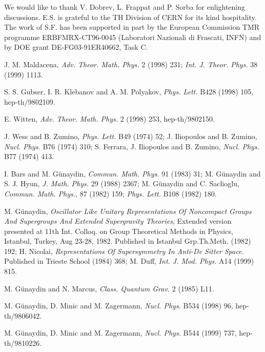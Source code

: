 \documentclass[a4paper,12pt]{article}
\begin{document}
We would like to thank V. Dobrev, L. Frappat and P. Sorba for 
enlightening discussions. E.S. is grateful to the TH Division of 
CERN for its kind hospitality. The work of S.F. has been 
supported in part by the European Commission TMR programme 
ERBFMRX-CT96-0045 (Laboratori Nazionali di Frascati, INFN) and by 
DOE grant DE-FG03-91ER40662, Task C.  


\vfill\eject
 
 
 


  


\begin{thebibliography}{99}

J. M. Maldacena, {\it  Adv. Theor. Math. Phys.} 2 (1998) 231; {\it  
Int. J. Theor. Phys.} 38 (1999) 1113. 

S. S. Gubser, I. R. Klebanov and A. M. Polyakov, {\it Phys. Lett.} 
B428 (1998) 105, hep-th/9802109. 

E. Witten, {\it Adv. Theor. Math. Phys.} 2 (1998) 253, 
hep-th/9802150. 

 J. Wess and B. Zumino, {\it Phys. Lett.} B49 (1974) 
52; J. Iliopoulos and B. Zumino, {\it Nucl. Phys.} B76 (1974) 310; 
 S. Ferrara,  J. Iliopoulos and B. Zumino, {\it Nucl. Phys.} B77 (1974) 413. 

I. Bars and  M. G\"unaydin, {\it Commun. Math. Phys.} 91 (1983)
31; M. G\"unaydin and S. J. Hyun, {\it J. Math. Phys.} 29 (1988) 2367; M. G\"unaydin and C. Saclioglu, {\it Commun. Math. Phys.}, 87 (1982) 159; {\it Phys. Lett.} B108 (1982) 180.

  M. 
G\"unaydin, {\it Oscillator Like Unitary Representations Of 
Noncompact Groups And Supergroups And Extended Supergravity 
Theories}, Extended version presented at 11th Int. Colloq. on 
Group Theoretical Methods in Physics, Istanbul, Turkey, Aug 23-28, 
1982. Published in Istanbul Grp.Th.Meth. (1982) 192; H. Nicolai, 
{\it Representations Of Supersymmetry In Anti-De Sitter Space}.   
Published in Trieste School (1984) 368; M. Duff, {\it  Int. J. 
Mod. Phys.} A14 (1999) 815. 

M. G\"unaydin and N. Marcus, {\it Class. Quantum Grav.} 2 (1985) 
L11. 

M. G\"unaydin, D. Minic and  M. Zagermann, {\it Nucl. Phys.} B534 
(1998) 96, hep-th/9806042. 

M. G\"unaydin, D. Minic and  M. Zagermann, {\it Nucl. Phys.} B544 
(1999) 737, hep-th/9810226. 


\end{thebibliography}
\end{document}
